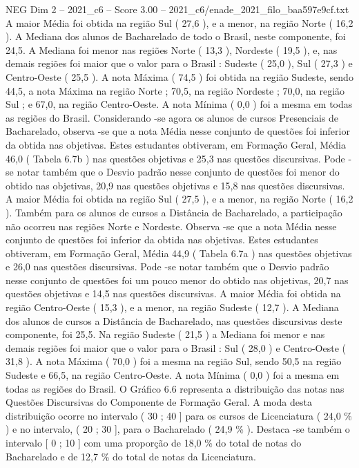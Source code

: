 \begin{textsample}{NEG Dim 2 – 2021\_c6 – Score 3.00 – 2021\_c6/enade\_2021\_filo\_baa597e9cf.txt}
A maior Média foi obtida na região Sul ( 27,6 ), e a menor, na região Norte ( 16,2 ).
A Mediana dos alunos de Bacharelado de todo o Brasil, neste componente, foi 24,5.
A Mediana foi menor nas regiões Norte ( 13,3 ), Nordeste ( 19,5 ), e, nas demais regiões foi maior que o valor para o Brasil : Sudeste ( 25,0 ), Sul ( 27,3 ) e Centro-Oeste ( 25,5 ).
A nota Máxima ( 74,5 ) foi obtida na região Sudeste, sendo 44,5, a nota Máxima na região Norte ; 70,5, na região Nordeste ; 70,0, na região Sul ; e 67,0, na região Centro-Oeste.
A nota Mínima ( 0,0 ) foi a mesma em todas as regiões do Brasil.
Considerando -se agora os alunos de cursos Presenciais de Bacharelado, observa -se que a nota Média nesse conjunto de questões foi inferior da obtida nas objetivas.
Estes estudantes obtiveram, em Formação Geral, Média 46,0 ( Tabela 6.7b ) nas questões objetivas e 25,3 nas questões discursivas.
Pode -se notar também que o Desvio padrão nesse conjunto de questões foi menor do obtido nas objetivas, 20,9 nas questões objetivas e 15,8 nas questões discursivas.
A maior Média foi obtida na região Sul ( 27,5 ), e a menor, na região Norte ( 16,2 ).
Também para os alunos de cursos a Distância de Bacharelado, a participação não ocorreu nas regiões Norte e Nordeste.
Observa -se que a nota Média nesse conjunto de questões foi inferior da obtida nas objetivas.
Estes estudantes obtiveram, em Formação Geral, Média 44,9 ( Tabela 6.7a ) nas questões objetivas e 26,0 nas questões discursivas.
Pode -se notar também que o Desvio padrão nesse conjunto de questões foi um pouco menor do obtido nas objetivas, 20,7 nas questões objetivas e 14,5 nas questões discursivas.
A maior Média foi obtida na região Centro-Oeste ( 15,3 ), e a menor, na região Sudeste ( 12,7 ).
A Mediana dos alunos de cursos a Distância de Bacharelado, nas questões discursivas deste componente, foi 25,5.
Na região Sudeste ( 21,5 ) a Mediana foi menor e nas demais regiões foi maior que o valor para o Brasil : Sul ( 28,0 ) e Centro-Oeste ( 31,8 ).
A nota Máxima ( 70,0 ) foi a mesma na região Sul, sendo 50,5 na região Sudeste e 66,5, na região Centro-Oeste.
A nota Mínima ( 0,0 ) foi a mesma em todas as regiões do Brasil.
O Gráfico 6.6 representa a distribuição das notas nas Questões Discursivas do Componente de Formação Geral.
A moda desta distribuição ocorre no intervalo ( 30 ; 40 ] para os cursos de Licenciatura ( 24,0 \% ) e no intervalo, ( 20 ; 30 ], para o Bacharelado ( 24,9 \% ).
Destaca -se também o intervalo [ 0 ; 10 ] com uma proporção de 18,0 \% do total de notas do Bacharelado e de 12,7 \% do total de notas da Licenciatura.

\end{textsample}
